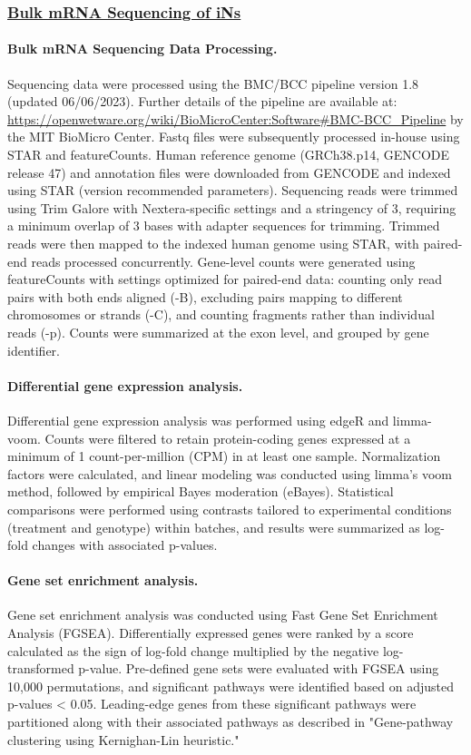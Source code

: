 \subsubsection{\underline{Bulk mRNA Sequencing of iNs}}

\paragraph{Bulk mRNA Sequencing Data Processing.}
Sequencing data were processed using the BMC/BCC pipeline version 1.8 (updated 06/06/2023). Further details of the pipeline are available at: \url{https://openwetware.org/wiki/BioMicroCenter:Software#BMC-BCC_Pipeline} by the MIT BioMicro Center. Fastq files were subsequently processed in-house using STAR and featureCounts. Human reference genome (GRCh38.p14, GENCODE release 47) and annotation files were downloaded from GENCODE and indexed using STAR (version recommended parameters). Sequencing reads were trimmed using Trim Galore with Nextera-specific settings and a stringency of 3, requiring a minimum overlap of 3 bases with adapter sequences for trimming. Trimmed reads were then mapped to the indexed human genome using STAR, with paired-end reads processed concurrently. Gene-level counts were generated using featureCounts with settings optimized for paired-end data: counting only read pairs with both ends aligned (-B), excluding pairs mapping to different chromosomes or strands (-C), and counting fragments rather than individual reads (-p). Counts were summarized at the exon level, and grouped by gene identifier.

\paragraph{Differential gene expression analysis.}
Differential gene expression analysis was performed using edgeR and limma-voom. Counts were filtered to retain protein-coding genes expressed at a minimum of 1 count-per-million (CPM) in at least one sample. Normalization factors were calculated, and linear modeling was conducted using limma's voom method, followed by empirical Bayes moderation (eBayes). Statistical comparisons were performed using contrasts tailored to experimental conditions (treatment and genotype) within batches, and results were summarized as log-fold changes with associated p-values.

\paragraph{Gene set enrichment analysis.}
Gene set enrichment analysis was conducted using Fast Gene Set Enrichment Analysis (FGSEA). Differentially expressed genes were ranked by a score calculated as the sign of log-fold change multiplied by the negative log-transformed p-value. Pre-defined gene sets were evaluated with FGSEA using 10,000 permutations, and significant pathways were identified based on adjusted p-values < 0.05. Leading-edge genes from these significant pathways were partitioned along with their associated pathways as described in "Gene-pathway clustering using Kernighan-Lin heuristic."

